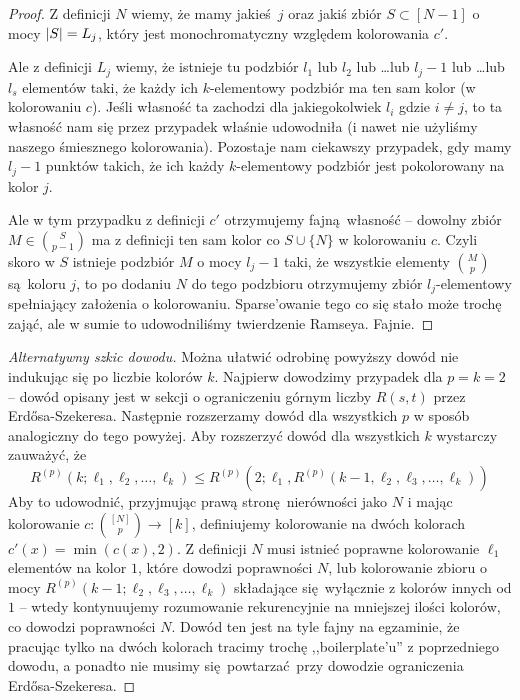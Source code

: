 \begin{proof}
	Z definicji \(N\) wiemy, że mamy jakieś \(j\) oraz jakiś zbiór \(S \subset [N-1]\) o mocy \(\card{S} = L_j\), który jest monochromatyczny względem kolorowania \(c'\).

	Ale z definicji \(L_j\) wiemy, że istnieje tu podzbiór \(l_1\) lub \(l_2\) lub \dots lub \(l_j - 1\) lub \dots lub \(l_s\) elementów taki, że każdy ich \(k\)-elementowy podzbiór ma ten sam kolor (w kolorowaniu \(c\)). Jeśli własność ta zachodzi dla jakiegokolwiek \(l_i\) gdzie \(i \neq j\), to ta własność nam się przez przypadek właśnie udowodniła (i nawet nie użyliśmy naszego śmiesznego kolorowania).
	Pozostaje nam ciekawszy przypadek, gdy mamy \(l_j - 1\) punktów takich, że ich każdy \(k\)-elementowy podzbiór jest pokolorowany na kolor \(j\).

	Ale w tym przypadku z definicji \(c'\) otrzymujemy fajną własność -- dowolny zbiór \(M \in \binom{S}{p-1}\) ma z definicji ten sam kolor co \(S \cup \{N\}\) w kolorowaniu \(c\). Czyli skoro w \(S\) istnieje podzbiór \(M\) o mocy \(l_j - 1\) taki, że wszystkie elementy \(\binom{M}{p}\) są koloru \(j\),
	to po dodaniu \(N\) do tego podzbioru otrzymujemy zbiór \(l_j\)-elementowy spełniający założenia o kolorowaniu. Sparse'owanie tego co się stało może trochę zająć, ale w sumie to udowodniliśmy twierdzenie Ramseya. Fajnie.
\end{proof}

\begin{proof}[Alternatywny szkic dowodu]
	Można ułatwić odrobinę powyższy dowód nie indukując się po liczbie kolorów \(k\).
	Najpierw dowodzimy przypadek dla \(p = k = 2\) -- dowód opisany jest w sekcji o ograniczeniu górnym liczby \(R(s, t)\) przez Erd\H{o}sa-Szekeresa.
	Następnie rozszerzamy dowód dla wszystkich \(p\) w sposób analogiczny do tego powyżej. Aby rozszerzyć dowód dla wszystkich \(k\) wystarczy zauważyć, że
	\[R^{(p)}(k; \ell_1, \ell_2, \ldots, \ell_k) \leq R^{(p)}(2; \ell_1, R^{(p)}(k-1, \ell_2, \ell_3, \ldots, \ell_k))\]
	Aby to udowodnić, przyjmując prawą stronę nierówności jako \(N\) i mając kolorowanie \(c: \binom{[N]}{p} \to [k]\), definiujemy kolorowanie na dwóch kolorach
	\(c'(x) = \min(c(x), 2)\). Z definicji \(N\) musi istnieć poprawne kolorowanie \(\ell_1\) elementów na kolor \(1\), które dowodzi poprawności \(N\),
	lub kolorowanie zbioru o mocy \(R^{(p)}(k-1; \ell_2, \ell_3, \ldots, \ell_k)\) składające się wyłącznie z kolorów innych od \(1\) --
	wtedy kontynuujemy rozumowanie rekurencyjnie na mniejszej ilości kolorów, co dowodzi poprawności \(N\).
	Dowód ten jest na tyle fajny na egzaminie, że pracując tylko na dwóch kolorach tracimy trochę ,,boilerplate'u'' z poprzedniego dowodu,
	a ponadto nie musimy się powtarzać przy dowodzie ograniczenia Erd\H{o}sa-Szekeresa.
\end{proof}